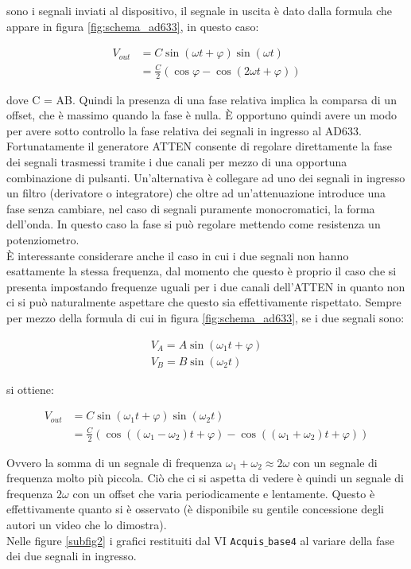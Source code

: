 \documentclass[10pt,letterpaper]{article}
\begin{document}
sono i segnali inviati al dispositivo, il segnale in uscita è dato dalla formula che appare in figura \ref{fig:schema_ad633}, in questo caso:

\begin{equation}
\begin{split}
V_{out} & = C \sin (\omega t + \varphi) \sin (\omega t) \\
		& = \frac{C}{2} ( \cos \varphi - \cos (2 \omega t + \varphi))
\end{split}
\end{equation}

dove C = AB. Quindi la presenza di una fase relativa implica la comparsa di un offset, che è massimo quando la fase è nulla. È opportuno quindi avere un modo per avere sotto controllo la fase relativa dei segnali in ingresso al AD633. Fortunatamente il generatore ATTEN consente di regolare direttamente la fase dei segnali trasmessi tramite i due canali per mezzo di una opportuna combinazione di pulsanti. Un'alternativa è collegare ad uno dei segnali in ingresso un filtro (derivatore o integratore) che oltre ad un'attenuazione introduce una fase senza cambiare, nel caso di segnali puramente monocromatici, la forma dell'onda. In questo caso la fase si può regolare mettendo come resistenza un potenziometro.\\
È interessante considerare anche il caso in cui i due segnali non hanno esattamente la stessa frequenza, dal momento che questo è proprio il caso che si presenta impostando frequenze uguali per i due canali dell'ATTEN in quanto non ci si può naturalmente aspettare che questo sia effettivamente rispettato. Sempre per mezzo della formula di cui in figura \ref{fig:schema_ad633}, se i due segnali sono:

\begin{gather}
V_A = A \sin (\omega _1 t + \varphi) \\
V_B = B \sin (\omega _2 t)
\end{gather}

si ottiene:

\begin{equation}
\begin{split}
V_{out} & = C \sin (\omega _1 t + \varphi) \sin (\omega  _2 t ) \\
		& = \frac{C}{2} ( \cos ((\omega _1 - \omega _2 ) t + \varphi) - \cos ((\omega _1 + \omega _2) t + \varphi))
\end{split}
\end{equation}

Ovvero la somma di un segnale di frequenza $\omega _1 + \omega _2 \approx 2 \omega$ con un segnale di frequenza molto più piccola. Ciò che ci si aspetta di vedere è quindi un segnale di frequenza $2 \omega$ con un offset che varia periodicamente e lentamente. Questo è effettivamente quanto si è osservato (è disponibile su gentile concessione degli autori un video che lo dimostra).\\ Nelle figure  \ref{subfig2} i grafici restituiti dal VI \texttt{Acquis$\_$base4} al variare della fase dei due segnali in ingresso.
\end{document}
